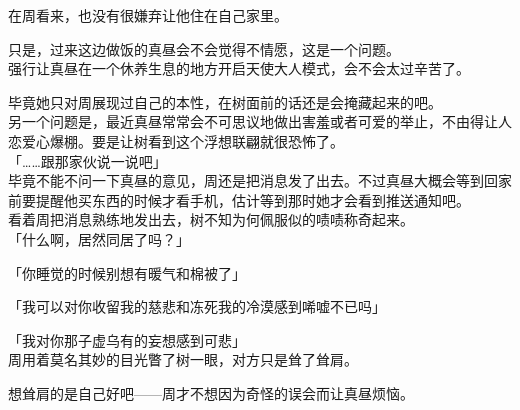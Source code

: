 在周看来，也没有很嫌弃让他住在自己家里。

只是，过来这边做饭的真昼会不会觉得不情愿，这是一个问题。\\

强行让真昼在一个休养生息的地方开启天使大人模式，会不会太过辛苦了。

毕竟她只对周展现过自己的本性，在树面前的话还是会掩藏起来的吧。\\

另一个问题是，最近真昼常常会不可思议地做出害羞或者可爱的举止，不由得让人恋爱心爆棚。要是让树看到这个浮想联翩就很恐怖了。\\

「……跟那家伙说一说吧」\\

毕竟不能不问一下真昼的意见，周还是把消息发了出去。不过真昼大概会等到回家前要提醒他买东西的时候才看手机，估计等到那时她才会看到推送通知吧。\\

看着周把消息熟练地发出去，树不知为何佩服似的啧啧称奇起来。\\

「什么啊，居然同居了吗？」

「你睡觉的时候别想有暖气和棉被了」

「我可以对你收留我的慈悲和冻死我的冷漠感到唏嘘不已吗」

「我对你那子虚乌有的妄想感到可悲」\\

周用着莫名其妙的目光瞥了树一眼，对方只是耸了耸肩。

想耸肩的是自己好吧——周才不想因为奇怪的误会而让真昼烦恼。\\

